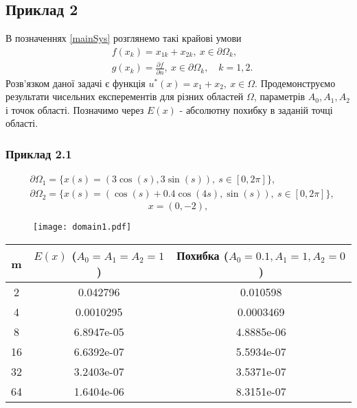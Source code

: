 \documentclass[12pt]{report}
\begin{document}
\subsection{Приклад 2}
  В позначеннях \eqref{mainSys} розглянемо такі крайові умови
 \begin{equation}
 \begin{split}
	&f(x_k)=x_{1k}+x_{2k}, \ x\in\partial\Omega_k, \\
	&g(x_k)=\frac{\partial f}{\partial n}, \ x\in\partial\Omega_k, \quad k =1,2. 
 \end{split}
 \end{equation}
 Розв'язком даної задачі є функція $u^*(x)=x_1+x_2, \ x\in\Omega$. Продемонструємо результати чисельних експерементів для різних областей $\Omega$, параметрів $A_0, A_1, A_2$ і точок області. Позначимо через $E(x)$ - абсолютну похибку в заданій точці області.
 
 \subsubsection{Приклад 2.1}
 
 \begin{equation}
 \begin{split}
 	&\partial\Omega_1= \{x(s)=(3\cos(s), 3\sin(s)),\ s\in[0,2\pi]\},\\
	&\partial\Omega_2= \{x(s)=(\cos(s)+0.4 \cos(4s),\sin(s)),\ s\in[0,2\pi]\},
 \end{split}
 \end{equation}
 $$x=(0, -2),$$
 
 \begin{figure}[h!]
\centering
	\texttt{[image: domain1.pdf]}
	\vspace*{-1cm}
\end{figure}
 
\begin{center}
\begin{tabular}{ |c|c|c| } 
 \hline
 m & \shortstack{$E(x)$  \\  ($A_0=A_1=A_2=1$)}  & \shortstack{Похибка  \\  ($A_0=0.1, A_1= 1,A_2=0$)}  \\ 
 \hline
 2 & 0.042796 & 0.010598 \\ 
 4 & 0.0010295 & 0.0003469 \\ 
 8 & 6.8947e-05 & 4.8885e-06 \\ 
16 & 6.6392e-07 & 5.5934e-07 \\ 
32 & 3.2403e-07 & 3.5371e-07 \\ 
64 & 1.6404e-06 & 8.3151e-07 \\ 
 \hline
\end{tabular}
\end{center}
\end{document}
